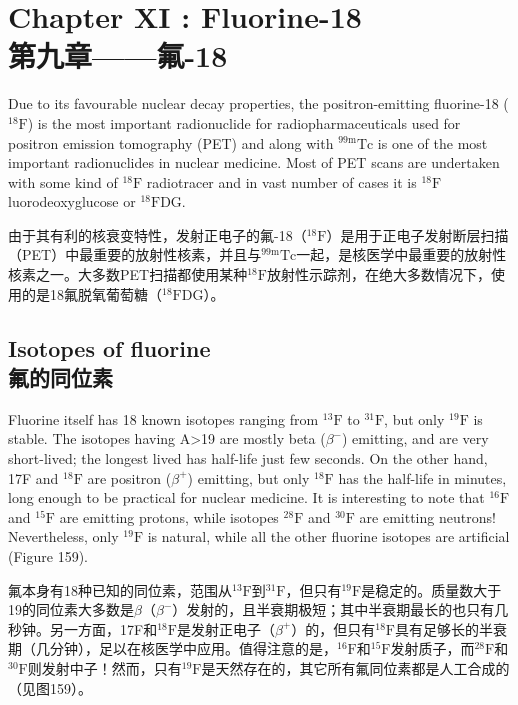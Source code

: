 \documentclass[dvipsnames, svgnames,a4paper,11pt]{article}
\begin{document}
\newpage


\section{Chapter XI : Fluorine-18 \\第九章——氟-18}

Due to its favourable nuclear decay properties, the positron-emitting fluorine-18 (${}^\mathrm{18}\mathrm{F}$)
is the most important radionuclide for radiopharmaceuticals used for positron
emission tomography (PET) and along with \(\mathrm{{}^{99m}Tc}\) is one of the most important
radionuclides in nuclear medicine. Most of PET scans are undertaken with some
kind of ${}^\mathrm{18}\mathrm{F}$ radiotracer and in vast number of cases it is ${}^\mathrm{18}\mathrm{F}$luorodeoxyglucose or
${}^\mathrm{18}\mathrm{F}$DG.

由于其有利的核衰变特性，发射正电子的氟-18（${}^\mathrm{18}\mathrm{F}$）是用于正电子发射断层扫描（PET）中最重要的放射性核素，并且与\(\mathrm{{}^{99m}Tc}\)一起，是核医学中最重要的放射性核素之一。大多数PET扫描都使用某种${}^\mathrm{18}\mathrm{F}$放射性示踪剂，在绝大多数情况下，使用的是18氟脱氧葡萄糖（${}^\mathrm{18}\mathrm{F}$DG）。


\subsection{Isotopes of fluorine \\氟的同位素}
Fluorine itself has 18 known isotopes ranging from ${}^\mathrm{13}\mathrm{F}$ to ${}^\mathrm{31}\mathrm{F}$, but only ${}^\mathrm{19}\mathrm{F}$ is stable.
The isotopes having A>19 are mostly beta ($\beta^{-}$) emitting, and are very short-lived; the
longest lived has half-life just few seconds. On the other hand, 17F and ${}^\mathrm{18}\mathrm{F}$ are
positron ($\beta^{+}$) emitting, but only ${}^\mathrm{18}\mathrm{F}$ has the half-life in minutes, long enough to be
practical for nuclear medicine. It is interesting to note that ${}^\mathrm{16}\mathrm{F}$ and ${}^\mathrm{15}\mathrm{F}$ are emitting
protons, while isotopes ${}^\mathrm{28}\mathrm{F}$ and ${}^\mathrm{30}\mathrm{F}$ are emitting neutrons! Nevertheless, only ${}^\mathrm{19}\mathrm{F}$ is
natural, while all the other fluorine isotopes are artificial (Figure 159).

氟本身有18种已知的同位素，范围从${}^\mathrm{13}\mathrm{F}$到${}^\mathrm{31}\mathrm{F}$，但只有${}^\mathrm{19}\mathrm{F}$是稳定的。质量数大于19的同位素大多数是$\beta$（$\beta^{-}$）发射的，且半衰期极短；其中半衰期最长的也只有几秒钟。另一方面，17F和${}^\mathrm{18}\mathrm{F}$是发射正电子（$\beta^{+}$）的，但只有${}^\mathrm{18}\mathrm{F}$具有足够长的半衰期（几分钟），足以在核医学中应用。值得注意的是，${}^\mathrm{16}\mathrm{F}$和${}^\mathrm{15}\mathrm{F}$发射质子，而${}^\mathrm{28}\mathrm{F}$和${}^\mathrm{30}\mathrm{F}$则发射中子！然而，只有${}^\mathrm{19}\mathrm{F}$是天然存在的，其它所有氟同位素都是人工合成的（见图159）。
\end{document}
